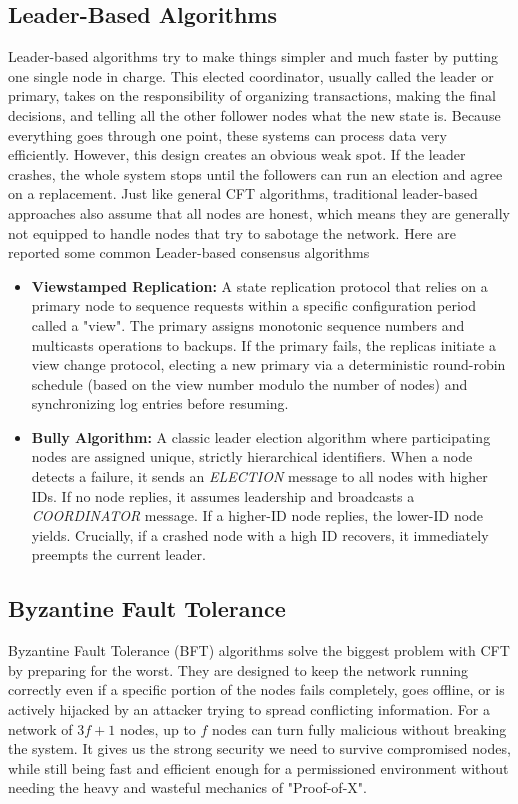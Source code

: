 \subsection{Leader-Based Algorithms}
Leader-based algorithms try to make things simpler and much faster by putting one single node in charge. This elected coordinator, usually called the leader or primary, takes on the responsibility of organizing transactions, making the final decisions, and telling all the other follower nodes what the new state is. Because everything goes through one point, these systems can process data very efficiently. However, this design creates an obvious weak spot. If the leader crashes, the whole system stops until the followers can run an election and agree on a replacement. Just like general CFT algorithms, traditional leader-based approaches also assume that all nodes are honest, which means they are generally not equipped to handle nodes that try to sabotage the network. Here are reported some common Leader-based consensus algorithms 
\begin{itemize}
    \item \textbf{Viewstamped Replication:} A state replication protocol that relies on a primary node to sequence requests within a specific configuration period called a "view". The primary assigns monotonic sequence numbers and multicasts operations to backups. If the primary fails, the replicas initiate a view change protocol, electing a new primary via a deterministic round-robin schedule (based on the view number modulo the number of nodes) and synchronizing log entries before resuming.
    \item \textbf{Bully Algorithm:} A classic leader election algorithm where participating nodes are assigned unique, strictly hierarchical identifiers. When a node detects a failure, it sends an \textit{ELECTION} message to all nodes with higher IDs. If no node replies, it assumes leadership and broadcasts a \textit{COORDINATOR} message. If a higher-ID node replies, the lower-ID node yields. Crucially, if a crashed node with a high ID recovers, it immediately preempts the current leader.
\end{itemize}

\subsection{Byzantine Fault Tolerance}
Byzantine Fault Tolerance (BFT) algorithms solve the biggest problem with CFT by preparing for the worst. They are designed to keep the network running correctly even if a specific portion of the nodes fails completely, goes offline, or is actively hijacked by an attacker trying to spread conflicting information. For a network of $3f+1$ nodes, up to $f$ nodes can turn fully malicious without breaking the system. It gives us the strong security we need to survive compromised nodes, while still being fast and efficient enough for a permissioned environment without needing the heavy and wasteful mechanics of "Proof-of-X".

